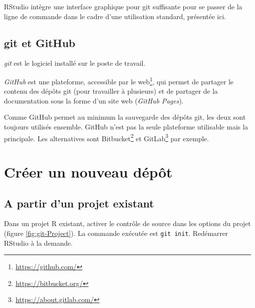 \documentclass[
  12pt,
  french,
  a4paper,
  extrafontsizes,onecolumn,openright
  ]{memoir}
\newlength{\rf}
\begin{document}
RStudio intègre une interface graphique pour git suffisante pour se passer de la ligne de commande dans le cadre d'une utilisation standard, présentée ici.

\hypertarget{git-et-github-1}{%
\subsection{git et GitHub}\label{git-et-github-1}}

\emph{git} est le logiciel installé sur le poste de travail.

\emph{GitHub} est une plateforme, accessible par le web\footnote{\url{https://github.com/}}, qui permet de partager le contenu des dépôts git (pour travailler à plusieurs) et de partager de la documentation sous la forme d'un site web (\emph{GitHub Pages}).

Comme GitHub permet au minimum la sauvegarde des dépôts git, les deux sont toujours utilisés ensemble.
GitHub n'est pas la seule plateforme utilisable mais la principale. Les alternatives sont Bitbucket\footnote{\url{https://bitbucket.org/}} et GitLab\footnote{\url{https://about.gitlab.com/}} par exemple.

\hypertarget{sec:creerdepot}{%
\section{Créer un nouveau dépôt}\label{sec:creerdepot}}

\hypertarget{a-partir-dun-projet-existant}{%
\subsection{A partir d'un projet existant}\label{a-partir-dun-projet-existant}}

Dans un projet R existant, activer le contrôle de source dans les options du projet (figure \ref{fig:git-Project}).
La commande exécutée est \texttt{git\ init}.
Redémarrer RStudio à la demande.



\scriptsize
\end{document}
